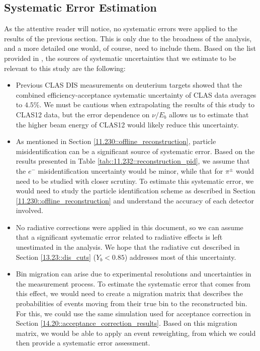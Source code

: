 \subsection{Systematic Error Estimation}
\label{14.40::systematic_error_estimation}
    As the attentive reader will notice, no systematic errors were applied to the results of the previous section.
    This is only due to the broadness of the analysis, and a more detailed one would, of course, need to include them.
    Based on the list provided in \cite{osipenko2010}, the sources of systematic uncertainties that we estimate to be relevant to this study are the following:

    \begin{itemize}
        \item
            Previous CLAS DIS measurements \cite{osipenko2006} on deuterium targets showed that the combined efficiency-acceptance systematic uncertainty of CLAS data averages to $4.5\%$.
            We must be cautious when extrapolating the results of this study to CLAS12 data, but the error dependence on $\nu/E_b$ allows us to estimate that the higher beam energy of CLAS12 would likely reduce this uncertainty.

        \item
            As mentioned in Section \ref{11.230::offline_reconstruction}, particle misidentification can be a significant source of systematic error.
            Based on the results presented in Table \ref{tab::11.232::reconstruction_pid}, we assume that the $e^-$ misidentification uncertainty would be minor, while that for $\pi^\pm$ would need to be studied with closer scrutiny.
            To estimate this systematic error, we would need to study the particle identification scheme as described in Section \ref{11.230::offline_reconstruction} and understand the accuracy of each detector involved.

        \item
            No radiative corrections were applied in this document, so we can assume that a significant systematic error related to radiative effects is left unestimated in the analysis.
            We hope that the radiative cut described in Section \ref{13.23::dis_cuts} ($Y_b < 0.85$) addresses most of this uncertainty.

        \item
            Bin migration can arise due to experimental resolutions and uncertainties in the measurement process.
            To estimate the systematic error that comes from this effect, we would need to create a migration matrix that describes the probabilities of events moving from their true bin to the reconstructed bin.
            For this, we could use the same simulation used for acceptance correction in Section \ref{14.20::acceptance_correction_results}.
            Based on this migration matrix, we would be able to apply an event reweighting, from which we could then provide a systematic error assessment.


\end{itemize}
